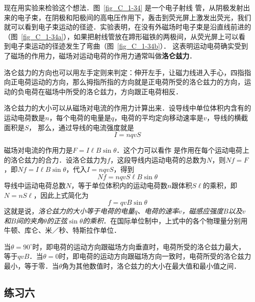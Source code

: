 现在用实验来检验这个想法．图~\ref{fig_C_1-34} 是一个电子射线
管，从阴极发射出来的电子束，在阴极和阳极间的高电压作用下，轰击到荧光屏上激发出荧光，我们就可以看到电子束运动的径迹．实验表明，在没有外磁场时电子束是沿直线前进的（图~\ref{fig_C_1-34a}），如果把射线管放在蹄形磁铁的两极间，从荧光屏上可以看到电子束运动的径迹发生了弯曲（图~\ref{fig_C_1-34b}）． 这表明运动电荷确实受到了磁场的作用力，磁场对运动电荷的作用力通常叫做\textbf{洛仑兹力}．

洛仑兹力的方向也可以用左手定则来判定：伸开左手，让磁力线进入手心，四指指向正电荷运动的方向，那么拇指所指的方向就是正电荷所受的洛仑兹力的方向，运动的负电荷在磁场中所受的洛仑兹力，方向跟正电荷相反．

洛仑兹力的大小可以从磁场对电流的作用力计算出来．设导线中单位体积内含有的运动电荷数是$n$，每个电荷的电量是$q$，电荷的平均定向移动速率是$v$，导线的横截面积是$S$，
那么，通过导线的电流强度就是
\[I=nqvS\]

磁场对电流的作用力是$F=I\ell B\sin\theta$．这个力可以看作
是作用在每个运动电荷上的洛仑兹力的合力．设洛仑兹力为$f$，这段导线内运动电荷的总数为$N$，则$Nf=F$，即$Nf=I\ell B\sin\theta$，代入$I=nqvS$，得到
\[Nf=nqvS\ell B\sin\theta \]
导线中运动电荷总数$N$，等于单位体积内的运动电荷数$n$跟体积$S\ell$的乘积，即$N=nS\ell$，因此上式简化为
\[f=qvB\sin\theta \]
这就是说，\textit{洛仑兹力的大小等于电荷的电量$q$、电荷的速率$v$，磁感应强度$B$以及$v$和$B$间的夹角$\theta$的正弦$\sin\theta$的乘积}．在国际单位制中，上式中的各个物理量分别用牛顿、库仑、米／秒、特斯拉作单位．

当$\theta=90^{\circ}$时，即电荷的运动方向跟磁场方向垂直时，电荷所受的洛仑兹力最大，等于$qvB$．当$\theta=0$时，即电荷的运动方向跟磁场方向一致时，电荷所受的洛仑兹力最小，等于零．当$\theta$角为其他数值时，洛仑兹力的大小在最大值和最小值之间．

\subsection*{练习六}

